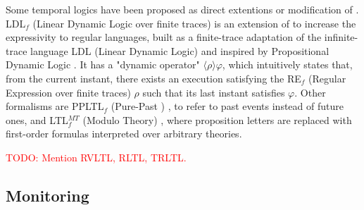 Some temporal logics have been proposed as direct extentions or modification of \ltlf. LDL$_f$ (Linear Dynamic Logic over finite traces) \cite{de2013linear,GiacomoV15} is an extension of \ltlf to increase the expressivity to regular languages, built as a finite-trace adaptation of the infinite-trace language LDL (Linear Dynamic Logic) \cite{vardi2011rise} and inspired by  Propositional Dynamic Logic \cite{fischer1979propositional,harel2000dynamic}. It has a "dynamic operator" $\langle \rho \rangle \varphi$, which intuitively states that, from the current instant, there exists an execution satisfying the RE$_f$ (Regular Expression over finite traces) \cite{hopcroft2001introduction,khoussainov2012automata} $\rho$ such that its last instant satisfies $\varphi$. Other formalisms are PPLTL$_f$ (Pure-Past \ltlf) \cite{de2020pure}, to refer to past events instead of future ones, and LTL$_f^{MT}$ (\ltlf Modulo Theory) \cite{geatti2022linear}, where proposition letters are replaced with first-order formulas interpreted over arbitrary theories.

\noindent
\textcolor{red}{TODO: Mention RVLTL, RLTL, TRLTL.}

\subsection{Monitoring}


